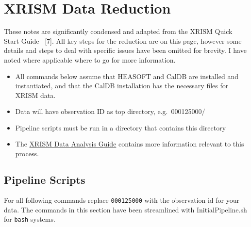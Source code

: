 \documentclass[
  letterpaper,
  DIV=11,
  numbers=noendperiod]{scrreprt}
\providecommand{\tightlist}{%
  \setlength{\itemsep}{0pt}\setlength{\parskip}{0pt}}
\begin{document}

\chapter{XRISM Data Reduction}\label{xrism-data-reduction}

These notes are significantly condensed and adapted from the XRISM Quick
Start Guide ~{[}7{]}. All key steps for the reduction are on this page,
however some details and steps to deal with specific issues have been
omitted for brevity. I have noted where applicable where to go for more
information.

\begin{tcolorbox}[enhanced jigsaw, arc=.35mm, bottomrule=.15mm, bottomtitle=1mm, breakable, colback=white, colbacktitle=quarto-callout-important-color!10!white, colframe=quarto-callout-important-color-frame, coltitle=black, left=2mm, leftrule=.75mm, opacityback=0, opacitybacktitle=0.6, rightrule=.15mm, title=\textcolor{quarto-callout-important-color}{\faExclamation}\hspace{0.5em}{Notes}, titlerule=0mm, toprule=.15mm, toptitle=1mm]

\begin{itemize}
\tightlist
\item
  All commands below assume that HEASOFT and CalDB are installed and
  instantiated, and that the CalDB installation has the
  \href{https://heasarc.gsfc.nasa.gov/docs/xrism/calib/index.html}{necessary
  files} for XRISM data.
\item
  Data will have observation ID as top directory, e.g.~000125000/
\item
  Pipeline scripts must be run in a directory that contains this
  directory
\item
  The
  \href{https://heasarc.gsfc.nasa.gov/docs/xrism/analysis/abc_guide/xrism_abc.html}{XRISM
  Data Analysis Guide} contains more information relevant to this
  process.
\end{itemize}

\end{tcolorbox}

\section{Pipeline Scripts}\label{pipeline-scripts}

For all following commands replace \texttt{000125000} with the
observation id for your data. The commands in this section have been
streamlined with InitialPipeline.sh for \texttt{bash} systems.
\end{document}
